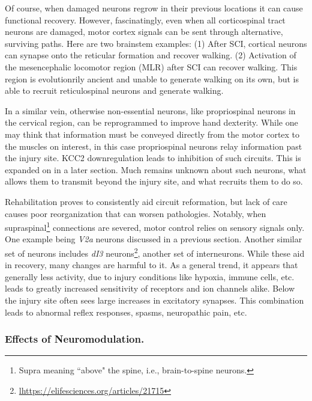Of course, when damaged neurons regrow in their previous locations it can cause functional recovery. However, fascinatingly, even when all corticospinal tract neurons are damaged, motor cortex signals can be sent through alternative, surviving paths. Here are two brainstem examples: (1) After SCI, cortical neurons can synapse onto the reticular formation and recover walking. (2) Activation of the mesencephalic locomotor region (MLR) after SCI can recover walking. This region is evolutionrily ancient and unable to generate walking on its own, but is able to recruit reticulospinal neurons and generate walking.\newline

In a similar vein, otherwise non-essential neurons, like propriospinal neurons in the cervical region, can be reprogrammed to improve hand dexterity. While one may think that information must be conveyed directly from the motor cortex to the muscles on interest, in this case propriospinal neurons relay information past the injury site. KCC2 downregulation leads to inhibition of such circuits. This is expanded on in a later section. Much remains unknown about such neurons, what allows them to transmit beyond the injury site, and what recruits them to do so.\newline

Rehabilitation proves to consistently aid circuit reformation, but lack of care causes poor reorganization that can worsen pathologies. Notably, when supraspinal\footnote{Supra meaning ``above" the spine, i.e., brain-to-spine neurons.} connections are severed, motor control relies on sensory signals only. One example being \textit{V2a} neurons discussed in a previous section. Another similar set of neurons includes \textit{dI3} neurons\footnote{\url{lhttps://elifesciences.org/articles/21715}}, another set of interneurons. While these aid in recovery, many changes are harmful to it. As a general trend, it appears that generally less activity, due to injury conditions like hypoxia, immune cells, etc. leads to greatly increased sensitivity of receptors and ion channels alike. Below the injury site often sees large increases in excitatory synapses. This combination leads to abnormal reflex responses, spasms, neuropathic pain, etc. 

\subsubsection{Effects of Neuromodulation.}

